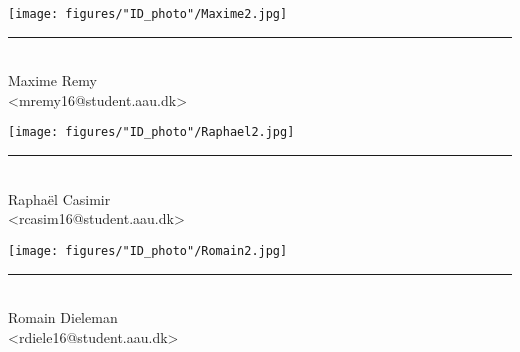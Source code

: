 \begin{center}


\begin{minipage}[b]{0.3\textwidth}
 \centering
 \texttt{[image: figures/"ID\_photo"/Maxime2.jpg]}
 \rule{\textwidth}{0.5pt}\\
  Maxime Remy\\
 {\footnotesize <mremy16@student.aau.dk>}
\end{minipage}
\begin{minipage}[b]{0.3\textwidth}
	\centering
	\texttt{[image: figures/"ID\_photo"/Raphael2.jpg]}
	\rule{\textwidth}{0.5pt}\\
	Raphaël Casimir\\
	{\footnotesize <rcasim16@student.aau.dk>}
\end{minipage}
\begin{minipage}[b]{0.3\textwidth}
	\centering
	\texttt{[image: figures/"ID\_photo"/Romain2.jpg]}
	\rule{\textwidth}{0.5pt}\\
	Romain Dieleman\\
	{\footnotesize <rdiele16@student.aau.dk>}
\end{minipage}



\end{center}
